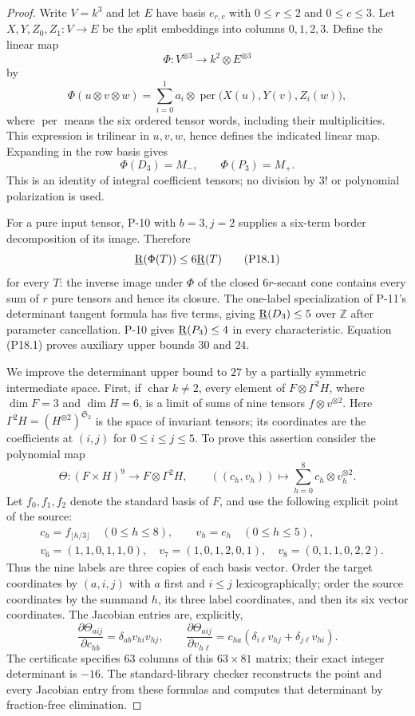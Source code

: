 \begin{proof}
Write $V=k^3$ and let $E$ have basis $e_{r,c}$ with
$0\leq r\leq2$ and $0\leq c\leq3$. Let
$X,Y,Z_0,Z_1:V\to E$ be the split embeddings into
columns $0,1,2,3$. Define the linear map
\[
 \Phi:V^{\otimes3}\longrightarrow k^2\otimes E^{\otimes3}
\]
by
\[
 \Phi(u\otimes v\otimes w)
 =\sum_{i=0}^1a_i\otimes
   \operatorname{per}\bigl(X(u),Y(v),Z_i(w)\bigr),
\]
where $\operatorname{per}$ means the six ordered tensor
words, including their multiplicities. This expression
is trilinear in $u,v,w$, hence defines the indicated
linear map. Expanding in the row basis gives
\[
 \Phi(D_3)=M_-,\qquad \Phi(P_3)=M_+.
\]
This is an identity of integral coefficient tensors;
no division by $3!$ or polynomial polarization is used.

For a pure input tensor, P-10 with $b=3,j=2$ supplies
a six-term border decomposition of its image. Therefore
\[
 \underline{\mathrm R}(\Phi(T))\leq6\underline{\mathrm R}(T)
 \tag{P18.1}
\]
for every $T$: the inverse image under $\Phi$ of the
closed $6r$-secant cone contains every sum of $r$
pure tensors and hence its closure. The one-label
specialization of P-11's determinant tangent formula
has five terms, giving $\underline{\mathrm R}(D_3)\leq5$ over
$\mathbb Z$ after parameter cancellation. P-10 gives
$\underline{\mathrm R}(P_3)\leq4$ in every characteristic. Equation
(P18.1) proves auxiliary upper bounds $30$ and $24$.

We improve the determinant upper bound to $27$ by a
partially symmetric intermediate space. First, if
$\operatorname{char}k\ne2$, every element of
$F\otimes\Gamma^2H$, where $\dim F=3$ and $\dim H=6$,
is a limit of sums of nine tensors $f\otimes v^{\otimes2}$.
Here $\Gamma^2H=(H^{\otimes2})^{\mathfrak S_2}$ is the
space of invariant tensors; its coordinates are the
coefficients at $(i,j)$ for $0\leq i\leq j\leq5$.
To prove this assertion consider the polynomial map
\[
 \Theta:(F\times H)^9\longrightarrow F\otimes\Gamma^2H,
 \qquad ((c_h,v_h))\longmapsto\sum_{h=0}^8c_h\otimes v_h^{\otimes2}.
 \tag{P18.3}
\]
Let $f_0,f_1,f_2$ denote the standard basis of $F$,
and use the following explicit point of the source:
\[
\begin{split}
 &c_h=f_{\lfloor h/3\rfloor}\quad(0\leq h\leq8),
 \qquad v_h=e_h\quad(0\leq h\leq5),\\
 &v_6=(1,1,0,1,1,0),\quad
 v_7=(1,0,1,2,0,1),\quad
 v_8=(0,1,1,0,2,2).
\end{split}
\]
Thus the nine labels are three copies of each basis
vector. Order the target
coordinates by $(a,i,j)$ with $a$ first and $i\leq j$
lexicographically; order the source coordinates by
the summand $h$, its three label coordinates, and
then its six vector coordinates. The Jacobian entries
are, explicitly,
\[
 \frac{\partial\Theta_{aij}}{\partial c_{hb}}
 =\delta_{ab}v_{hi}v_{hj},\qquad
 \frac{\partial\Theta_{aij}}{\partial v_{h\ell}}
 =c_{ha}(\delta_{i\ell}v_{hj}+\delta_{j\ell}v_{hi}).
\]
The certificate 
specifies $63$ columns of this $63\times81$ matrix;
their exact integer determinant is $-16$.
The standard-library checker
 reconstructs the
point and every Jacobian entry from these formulas
and computes that determinant by fraction-free elimination.


\end{proof}
